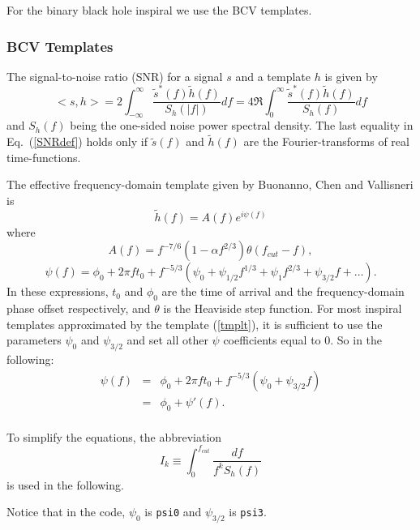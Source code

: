 For the binary black hole inspiral we use the BCV templates.

\subsubsection*{BCV Templates}
\label{BCV}

The signal-to-noise ratio (SNR) for a signal $s$ and a template $h$ is given by
\begin{equation}
<s,h> = 2 \int_{-\infty}^{\infty} \frac{\tilde{s}^{\ast}(f) \tilde{h}(f)}
{S_h(|f|)} df =
4 \Re \int_0^{\infty} \frac{\tilde{s}^{\ast}(f) \tilde{h}(f)}{S_h(f)} df
\label{SNRdef}
\end{equation}
and $S_h(f)$ being the one-sided noise power spectral density.
The last equality in Eq.~(\ref{SNRdef}) holds only if $\tilde{s}(f)$ and
$\tilde{h}(f)$ are the Fourier-transforms of real time-functions.

The effective frequency-domain template given by Buonanno, Chen and Vallisneri
\cite{BCVPaper} is
\begin{equation}
\tilde{h}(f) = A(f) e^{i \psi(f)}
\label{tmplt}
\end{equation}
where
\begin{equation}
A(f) = f^{-7/6} (1-\alpha f^{2/3}) \theta (f_{cut}-f),
\end{equation}
\begin{equation}
\psi(f) = \phi_0 + 2 \pi f t_0 + f^{-5/3} (\psi_0 + \psi_{1/2} f^{1/3} +
\psi_1 f^{2/3} + \psi_{3/2} f + \ldots).
\end{equation}
In these expressions, $t_0$ and $\phi_0$ are the time of arrival and the
frequency-domain phase offset respectively,
and $\theta$ is the Heaviside step function.
For most inspiral templates approximated by the template (\ref{tmplt}),
it is sufficient to use the parameters $\psi_0$ and $\psi_{3/2}$ and set all
other $\psi$ coefficients equal to 0.
So in the following:
\begin{eqnarray}
\psi(f) &=& \phi_0 + 2 \pi f t_0 + f^{-5/3} (\psi_0 + \psi_{3/2} f)\\
&=& \phi_0 + \psi'(f) . \\
\end{eqnarray}

To simplify the equations, the abbreviation
\begin{equation}
I_k \equiv \int_0^{f_{cut}} \frac{df}{f^k S_h(f)}
\end{equation}
is used in the following.

Notice that in the code, $\psi_0$ is \texttt{psi0} and $\psi_{3/2}$ is
\texttt{psi3}.

